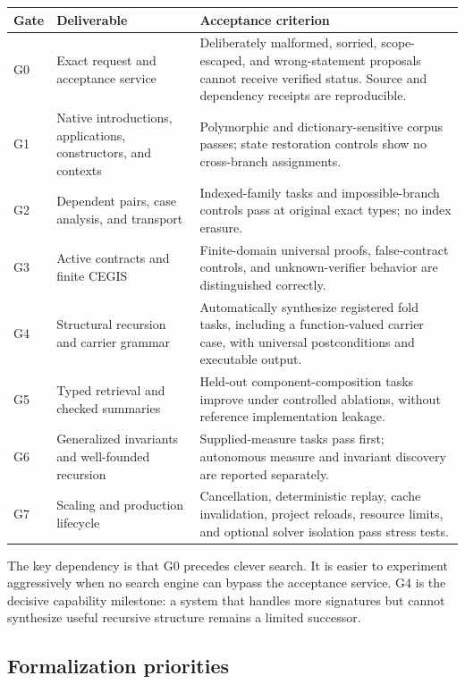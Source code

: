 \documentclass[11pt,letterpaper]{article}
\theoremstyle{definition}
\theoremstyle{remark}
\begin{document}
\begin{longtable}{@{}p{}p{}p{}@{}}
\toprule
Gate & Deliverable & Acceptance criterion\\
\midrule
\endhead
G0 & Exact request and acceptance service & Deliberately malformed, sorried, scope-escaped, and wrong-statement proposals cannot receive verified status. Source and dependency receipts are reproducible.\\
G1 & Native introductions, applications, constructors, and contexts & Polymorphic and dictionary-sensitive corpus passes; state restoration controls show no cross-branch assignments.\\
G2 & Dependent pairs, case analysis, and transport & Indexed-family tasks and impossible-branch controls pass at original exact types; no index erasure.\\
G3 & Active contracts and finite CEGIS & Finite-domain universal proofs, false-contract controls, and unknown-verifier behavior are distinguished correctly.\\
G4 & Structural recursion and carrier grammar & Automatically synthesize registered fold tasks, including a function-valued carrier case, with universal postconditions and executable output.\\
G5 & Typed retrieval and checked summaries & Held-out component-composition tasks improve under controlled ablations, without reference implementation leakage.\\
G6 & Generalized invariants and well-founded recursion & Supplied-measure tasks pass first; autonomous measure and invariant discovery are reported separately.\\
G7 & Scaling and production lifecycle & Cancellation, deterministic replay, cache invalidation, project reloads, resource limits, and optional solver isolation pass stress tests.\\
\bottomrule
\end{longtable}

The key dependency is that G0 precedes clever search. It is easier to experiment aggressively when no search engine can bypass the acceptance service. G4 is the decisive capability milestone: a system that handles more signatures but cannot synthesize useful recursive structure remains a limited successor.

\subsection{Formalization priorities}
\end{document}
